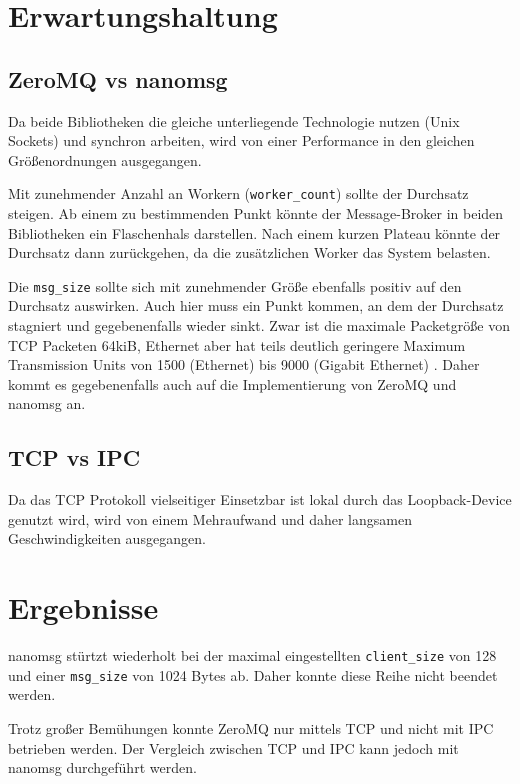 \documentclass{article}
\begin{document}
\section{Erwartungshaltung}

\subsection{ZeroMQ vs nanomsg}

Da beide Bibliotheken die gleiche unterliegende Technologie nutzen (Unix
Sockets) und synchron arbeiten, wird von einer Performance in den gleichen Grö\-ßen\-ord\-nun\-gen
ausgegangen. 

Mit zunehmender Anzahl an Workern (\texttt{worker\_count}) sollte der Durchsatz
steigen. Ab einem zu bestimmenden Punkt könnte der Message-Broker 
in beiden Bibliotheken ein Flaschenhals darstellen. Nach einem kurzen Plateau könnte
der Durchsatz dann zurückgehen, da die zusätzlichen Worker das System belasten.

Die \texttt{msg\_size} sollte sich mit zunehmender Größe ebenfalls
positiv auf den Durchsatz
auswirken. Auch hier muss ein Punkt kommen, an dem der Durchsatz
stagniert und gegebenenfalls wieder sinkt. Zwar ist die maximale
Packetgröße von TCP Packeten 64kiB,
Ethernet aber hat teils deutlich geringere Maximum Transmission Units
von 1500 (Ethernet) bis 9000 (Gigabit Ethernet) \cite{noauthor_maximum_2021}. Daher kommt es
gegebenenfalls auch auf die Implementierung von ZeroMQ und nanomsg an.

\subsection{TCP vs IPC}

Da das TCP Protokoll vielseitiger Einsetzbar ist lokal durch das Loopback-Device genutzt wird, wird von einem Mehraufwand und 
daher langsamen Ge\-schwin\-dig\-keit\-en ausgegangen. 

\section{Ergebnisse}

nanomsg stürtzt wiederholt bei der maximal eingestellten
\texttt{client\_size} von 128 und einer \texttt{msg\_size} von 1024
Bytes ab. Daher konnte diese Reihe nicht beendet werden.

Trotz großer Bemühungen konnte ZeroMQ nur mittels TCP und nicht mit IPC
betrieben werden. Der Vergleich zwischen TCP und IPC kann jedoch mit
nanomsg durchgeführt werden.
\end{document}
